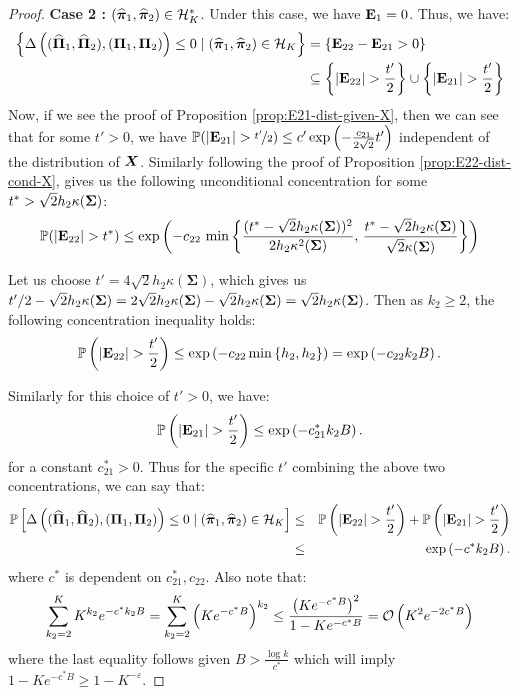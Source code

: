 \documentclass[numsec,webpdf,modern,medium,namedate]{oup-authoring-template}
\theoremstyle{thmstyleone}%
\theoremstyle{thmstyletwo}%
\theoremstyle{thmstylethree}%
\begin{document}
\begin{proof}
\textbf{Case 2 :} $(\widehat{\boldsymbol{\pi}}_1, \widehat{\boldsymbol{\pi}}_2 ) \in \mathcal{H}^\ast_K$. Under this case, we have $\mathbf{E}_1 = 0$. Thus, we have:
{\small
$$
\begin{aligned}
\left\{\Delta \left( (\widehat{\boldsymbol{\Pi}}_1, \widehat{\boldsymbol{\Pi}}_2 ), \left( \boldsymbol{\Pi}_1, \boldsymbol{\Pi}_2 \right) \right) \leq 0 \mid (\widehat{\boldsymbol{\pi}}_1, \widehat{\boldsymbol{\pi}}_2 ) \in \mathcal{H}_K \right\} & = \{\mathbf{E}_{22} - \mathbf{E}_{21} >0 \}\\
& \subseteq \left\{\left|\mathbf{E}_{22}\right| > \frac {t'}2\right\} \cup \left\{\left|\mathbf{E}_{21}\right| > \frac {t'}2\right\}
\end{aligned}
$$}
Now, if we see the proof of Proposition \ref{prop:E21-dist-given-X}, then we can see that for some $t'>0$, we have $ \Prob(|\bE_{21}|> \nicefrac{t'}{2})\leq c'\exp\left(-\frac{c_{21}}{2\sqrt{2}}t'\right)$ independent of the distribution of $\boldsymbol{X}$. Similarly following the proof of Proposition \ref{prop:E22-dist-cond-X}, gives us the following unconditional concentration for some $t^\ast > \sqrt{2}h_2\kappa(\boldsymbol{\Sigma})$:
\begin{equation*}
        \Prob(|\bE_{22}|> t^\ast)\leq \exp \left( - c_{22} \, \min \left\{ \frac{(t^\ast-\sqrt{2}h_2\kappa(\bSig))^2}{2h_2\kappa^2({\bSig})}, \, \frac{t^\ast-\sqrt{2}h_2\kappa(\bSig)}{\sqrt{2}\kappa(\bSig)} \right\} \right)
\end{equation*}

Let us choose $ t' = 4\sqrt{2}h_2 \kappa(\boldsymbol{\Sigma})$, which gives us $t'/2 - \sqrt{2}h_2\kappa(\boldsymbol{\Sigma}) = 2\sqrt{2}h_2 \kappa(\boldsymbol{\Sigma}) - \sqrt{2}h_2\kappa(\boldsymbol{\Sigma}) = \sqrt{2}h_2\kappa(\boldsymbol{\Sigma}) $. Then as $k_2 \geq 2$, the following concentration inequality holds:
\begin{equation}
    \mathbb{P}\left( |\mathbf{E}_{22}| > \frac{t'}{2} \right)
    \leq  \exp\left( - c_{22}\min\left\{ h_2, h_2 \right\} \right) = \exp\left( -c_{22}k_2B \right).
\end{equation}

Similarly for this choice of $t'>0$, we have:
\begin{equation}
    \mathbb{P}\left( |\mathbf{E}_{21}| > \frac{t'}{2} \right)
    \leq  \exp\left( -c^\ast_{21}k_2B \right).
\end{equation}
for a constant $c_{21}^\ast > 0$. Thus for the specific $t'$ combining the above two concentrations, we can say that:
\begin{eqnarray*}
    \mathbb{P}\left[\Delta \left( (\widehat{\boldsymbol{\Pi}}_1, \widehat{\boldsymbol{\Pi}}_2 ), \left( \boldsymbol{\Pi}_1, \boldsymbol{\Pi}_2 \right) \right) \leq 0 \mid (\widehat{\boldsymbol{\pi}}_1, \widehat{\boldsymbol{\pi}}_2 ) \in \mathcal{H}_K \right] & \leq & \mathbb{P}\left(\left|\mathbf{E}_{22}\right| > \frac {t'}2\right) + \mathbb{P}\left(\left|\mathbf{E}_{21}\right| > \frac {t'}2\right)\\
    & \leq & \exp\left( -c^\ast k_2B \right).
\end{eqnarray*}
where $c^\ast$ is dependent on $c_{21}^\ast, c_{22}$. Also note that:
\begin{equation}\label{eq:hk-star-bound}
    \sum_{k_2=2}^K K^{k_2}  e^{-c^\ast k_2B} = \sum_{k_2=2}^K \left(Ke^{-c^\ast B}\right)^{k_2} \leq \frac{\big(K e^{-c^\ast B}\big)^{2}}{1-K e^{-c^\ast B}} = \mathcal{O}\left(K^2 e^{-2c^\ast B}\right)
\end{equation}
where the last equality follows given $B>\tfrac{\log k}{c^\ast}$ which will imply $1-K e^{-c^\ast B}\ge 1-K^{-\varepsilon}$.


\end{proof}
\end{document}
